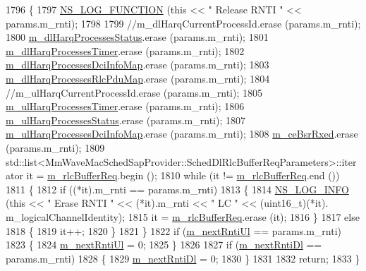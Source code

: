 \begin{DoxyCode}
1796 \{
1797   \hyperlink{log-macros-disabled_8h_a90b90d5bad1f39cb1b64923ea94c0761}{NS\_LOG\_FUNCTION} (\textcolor{keyword}{this} << \textcolor{stringliteral}{" Release RNTI "} << params.m\_rnti);
1798 
1799   \textcolor{comment}{//m\_dlHarqCurrentProcessId.erase (params.m\_rnti);}
1800   \hyperlink{classns3_1_1MmWaveFlexTtiPfMacScheduler_ac8fbe1bcc35d738ae7944797590909fc}{m\_dlHarqProcessesStatus}.erase  (params.m\_rnti);
1801   \hyperlink{classns3_1_1MmWaveFlexTtiPfMacScheduler_a833b2d085a67e2fcb7403ebe1f4c6f86}{m\_dlHarqProcessesTimer}.erase (params.m\_rnti);
1802   \hyperlink{classns3_1_1MmWaveFlexTtiPfMacScheduler_a409de362c5e49fc6956b26ee2644db4d}{m\_dlHarqProcessesDciInfoMap}.erase  (params.m\_rnti);
1803   \hyperlink{classns3_1_1MmWaveFlexTtiPfMacScheduler_a9a0027a79dee0a60f04e55c25efb7ab7}{m\_dlHarqProcessesRlcPduMap}.erase  (params.m\_rnti);
1804   \textcolor{comment}{//m\_ulHarqCurrentProcessId.erase  (params.m\_rnti);}
1805   \hyperlink{classns3_1_1MmWaveFlexTtiPfMacScheduler_ac22941904760bb3380302039caad87e0}{m\_ulHarqProcessesTimer}.erase (params.m\_rnti);
1806   \hyperlink{classns3_1_1MmWaveFlexTtiPfMacScheduler_aee0051900f7d928d25d577ad83983bf4}{m\_ulHarqProcessesStatus}.erase  (params.m\_rnti);
1807   \hyperlink{classns3_1_1MmWaveFlexTtiPfMacScheduler_a8b50ed4fc6df0561404f4aad5aa3d384}{m\_ulHarqProcessesDciInfoMap}.erase  (params.m\_rnti);
1808   \hyperlink{classns3_1_1MmWaveFlexTtiPfMacScheduler_acc3a35569b9506219629a0cbc7a53e44}{m\_ceBsrRxed}.erase (params.m\_rnti);
1809   std::list<MmWaveMacSchedSapProvider::SchedDlRlcBufferReqParameters>::iterator it = 
      \hyperlink{classns3_1_1MmWaveFlexTtiPfMacScheduler_adc38b71e3ba396af89586e28148853d5}{m\_rlcBufferReq}.begin ();
1810   \textcolor{keywordflow}{while} (it != \hyperlink{classns3_1_1MmWaveFlexTtiPfMacScheduler_adc38b71e3ba396af89586e28148853d5}{m\_rlcBufferReq}.end ())
1811     \{
1812       \textcolor{keywordflow}{if} ((*it).m\_rnti == params.m\_rnti)
1813         \{
1814           \hyperlink{group__logging_gafbd73ee2cf9f26b319f49086d8e860fb}{NS\_LOG\_INFO} (\textcolor{keyword}{this} << \textcolor{stringliteral}{" Erase RNTI "} << (*it).m\_rnti << \textcolor{stringliteral}{" LC "} << (uint16\_t)(*it).
      m\_logicalChannelIdentity);
1815           it = \hyperlink{classns3_1_1MmWaveFlexTtiPfMacScheduler_adc38b71e3ba396af89586e28148853d5}{m\_rlcBufferReq}.erase (it);
1816         \}
1817       \textcolor{keywordflow}{else}
1818         \{
1819           it++;
1820         \}
1821     \}
1822   \textcolor{keywordflow}{if} (\hyperlink{classns3_1_1MmWaveFlexTtiPfMacScheduler_a45c548d99fc16a2315c5518200d5f142}{m\_nextRntiUl} == params.m\_rnti)
1823     \{
1824       \hyperlink{classns3_1_1MmWaveFlexTtiPfMacScheduler_a45c548d99fc16a2315c5518200d5f142}{m\_nextRntiUl} = 0;
1825     \}
1826 
1827   \textcolor{keywordflow}{if} (\hyperlink{classns3_1_1MmWaveFlexTtiPfMacScheduler_a8678f0d1bce3f85ace69a8256c432cdb}{m\_nextRntiDl} == params.m\_rnti)
1828     \{
1829       \hyperlink{classns3_1_1MmWaveFlexTtiPfMacScheduler_a8678f0d1bce3f85ace69a8256c432cdb}{m\_nextRntiDl} = 0;
1830     \}
1831 
1832   \textcolor{keywordflow}{return};
1833 \}
\end{DoxyCode}


